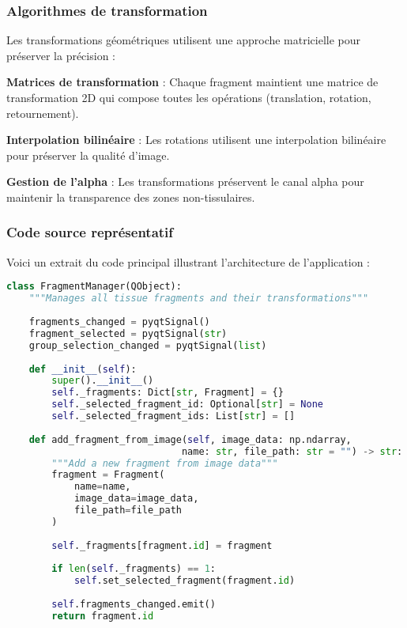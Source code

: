 \documentclass[12pt,a4paper]{report}
\begin{document}
\subsubsection{Algorithmes de transformation}

Les transformations géométriques utilisent une approche matricielle pour préserver la précision :

\textbf{Matrices de transformation} : Chaque fragment maintient une matrice de transformation 2D qui compose toutes les opérations (translation, rotation, retournement).

\textbf{Interpolation bilinéaire} : Les rotations utilisent une interpolation bilinéaire pour préserver la qualité d'image.

\textbf{Gestion de l'alpha} : Les transformations préservent le canal alpha pour maintenir la transparence des zones non-tissulaires.

\subsubsection{Code source représentatif}

Voici un extrait du code principal illustrant l'architecture de l'application :

\begin{lstlisting}[language=Python, caption=Gestionnaire de fragments - Classe principale]
class FragmentManager(QObject):
    """Manages all tissue fragments and their transformations"""
    
    fragments_changed = pyqtSignal()
    fragment_selected = pyqtSignal(str)
    group_selection_changed = pyqtSignal(list)
    
    def __init__(self):
        super().__init__()
        self._fragments: Dict[str, Fragment] = {}
        self._selected_fragment_id: Optional[str] = None
        self._selected_fragment_ids: List[str] = []
    
    def add_fragment_from_image(self, image_data: np.ndarray, 
                               name: str, file_path: str = "") -> str:
        """Add a new fragment from image data"""
        fragment = Fragment(
            name=name,
            image_data=image_data,
            file_path=file_path
        )
        
        self._fragments[fragment.id] = fragment
        
        if len(self._fragments) == 1:
            self.set_selected_fragment(fragment.id)
            
        self.fragments_changed.emit()
        return fragment.id
\end{lstlisting}
\end{document}
